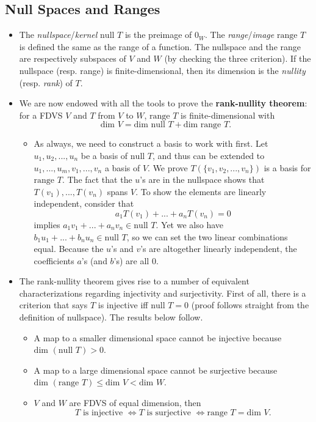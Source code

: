 \documentclass{article}
\newcommand{\n}{\text{null }}
\renewcommand{\r}{\text{range }}
\renewcommand{\d}{\text{dim }}
\begin{document}
\subsection{Null Spaces and Ranges}
\begin{itemize}
    \item The \textit{nullspace}/\textit{kernel} $\n T$ is the preimage of $0_W$. The \textit{range}/\textit{image} $\r T$ is defined the same as the range of a function. The nullspace and the range are respectively subspaces of $V$ and $W$ (by checking the three criterion). If the nullspace (resp. range) is finite-dimensional, then its dimension is the \textit{nullity} (resp. \textit{rank}) of $T$.
    \item We are now endowed with all the tools to prove the \textbf{rank-nullity theorem}: for a FDVS $V$ and $T$ from $V$ to $W$, $\r T$ is finite-dimensional with $$\d V = \d \n T + \d \r T.$$
    \begin{itemize}
        \item As always, we need to construct a basis to work with first. Let ${u_1, u_2, ..., u_n}$ be a basis of $\n T$, and thus can be extended to ${u_1,...,u_m,v_1,...,v_n}$ a basis of $V$. We prove $T(\{v_1, v_2, ..., v_n\})$ is a basis for $\r T$. The fact that the $u$'s are in the nullspace shows that $T(v_1), ...,T(v_n)$ spans $V$. To show the elements are linearly independent, consider that $$a_1 T(v_1)+...+a_n T(v_n) = 0$$ implies $a_1v_1+...+a_nv_n \in \n T$. Yet we also have $b_1u_1+...+b_nu_n \in \n T$, so we can set the two linear combinations equal. Because the $u$'s and $v$'s are altogether linearly independent, the coefficients $a$'s (and $b$'s) are all 0.
    \end{itemize}
    \item The rank-nullity theorem gives rise to a number of equivalent characterizations regarding injectivity and surjectivity. First of all, there is a criterion that says $T$ is injective iff $\n T = {0}$ (proof follows straight from the definition of nullspace). The results below follow.
    \begin{itemize}
        \item A map to a smaller dimensional space cannot be injective because $\d (\n T) > 0$.
        \item A map to a large dimensional space cannot be surjective because $\d (\r T) \leq \d V < \d W$.
        \item $V$ and $W$ are FDVS of equal dimension, then $$T \text{ is injective } \Longleftrightarrow T \text{ is surjective } \Longleftrightarrow \r T = \d V.$$

\end{itemize}
\end{itemize}
\end{document}
